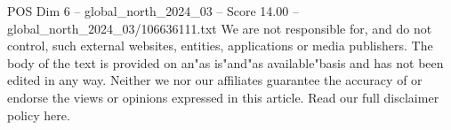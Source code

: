 \begin{textsample}{POS Dim 6 – global\_north\_2024\_03 – Score 14.00 – global\_north\_2024\_03/106636111.txt}
We are not responsible for, and do not control, such external websites, entities, applications or media publishers.
The body of the text is provided on an"as is"and"as available"basis and has not been edited in any way.
Neither we nor our affiliates guarantee the accuracy of or endorse the views or opinions expressed in this article.
Read our full disclaimer policy here.

\end{textsample}
